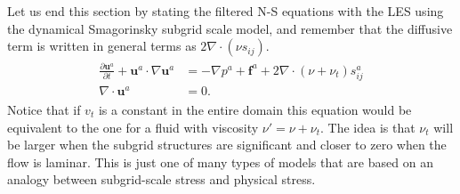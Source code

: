 Let us end this section by stating the filtered N-S equations with the LES using 
the dynamical Smagorinsky subgrid scale model, and remember that the diffusive term is written 
in general terms as $2\nabla \cdot (\nu s_{ij})$.  
%
\begin{align}
    \begin{split}
        \frac{\partial \mathbf{u}^a}{\partial t} + \mathbf{u}^a\cdot \nabla\mathbf{u}^a
        &= -\nabla p^a+\mathbf{f}^a +2\nabla \cdot (\nu + \nu_t) s^a_{ij} \\
        \nabla \cdot \mathbf{u}^a &= 0.
    \end{split}
	\label{eq:NSLES}
\end{align}
%
Notice that if $v_t$ is a constant in the entire domain this equation would 
be equivalent to the one for a fluid with viscosity $\nu'= \nu + \nu_t$. The idea is 
that $\nu_t$ will be larger when the subgrid structures are significant and closer to zero 
when the flow is laminar. This is just one of many types of models that are based on an 
analogy between subgrid-scale stress and physical stress. 



